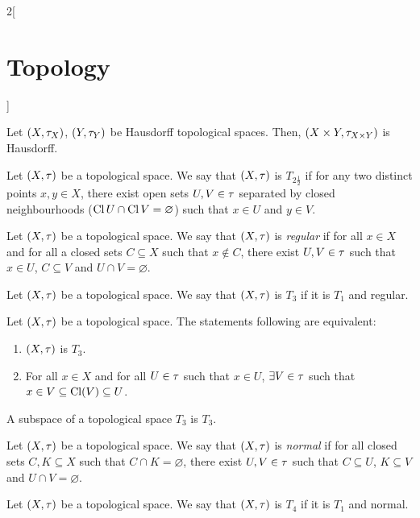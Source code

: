 \documentclass[../../../main.tex]{subfiles}
\begin{document}
\begin{multicols}{2}[\section{Topology}]
\begin{prop}
    Let $(X,\tau_X)$, $(Y,\tau_Y)$ be Hausdorff topological spaces. Then, $(X\times Y,\tau_{X\times Y})$ is Hausdorff.
  \end{prop}
  \begin{definition}
    Let $(X,\tau)$ be a topological space. We say that $(X,\tau)$ is $T_{2\frac{1}{2}}$ if for any two distinct points $x,y\in X$, there exist open sets $U,V\in\tau$ separated by closed neighbourhoods ($\operatorname{Cl} U\cap \operatorname{Cl} V=\varnothing$) such that $x\in U$ and $y\in V$.
  \end{definition}
  \begin{definition}
    Let $(X,\tau)$ be a topological space. We say that $(X,\tau)$ is \emph{regular} if for all $x\in X$ and for all a closed sets $C\subseteq X$ such that $x\notin C$, there exist $U,V\in\tau$ such that $x\in U$, $C\subseteq V$ and $U\cap V=\varnothing$.
  \end{definition}
  \begin{definition}[$T_3$ space]
    Let $(X,\tau)$ be a topological space. We say that $(X,\tau)$ is $T_3$ if it is $T_1$ and regular.
  \end{definition}
  \begin{theorem}
    Let $(X,\tau)$ be a topological space. The statements following are equivalent:
    \begin{enumerate}
      \item $(X,\tau)$ is $T_3$.
      \item For all $x\in X$ and for all $U\in\tau$ such that $x\in U$, $\exists V\in\tau$ such that $x\in V\subseteq\operatorname{Cl}(V)\subseteq U$.
    \end{enumerate}
  \end{theorem}
  \begin{theorem}
    A subspace of a topological space $T_3$ is $T_3$.
  \end{theorem}
  \begin{definition}
    Let $(X,\tau)$ be a topological space. We say that $(X,\tau)$ is \emph{normal} if for all closed sets $C,K\subseteq X$ such that $C\cap K=\varnothing$, there exist $U,V\in\tau$ such that $C\subseteq U$, $K\subseteq V$ and $U\cap V=\varnothing$.
  \end{definition}
  \begin{definition}[$T_4$ space]
    Let $(X,\tau)$ be a topological space. We say that $(X,\tau)$ is $T_4$ if it is $T_1$ and normal.
  \end{definition}
  \begin{theorem}

\end{theorem}
\end{multicols}
\end{document}
